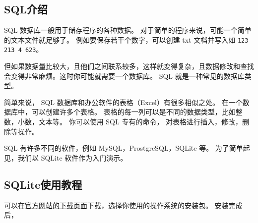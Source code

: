 

\subsection{SQL介绍}
SQL 数据库一般用于储存程序的各种数据。 对于简单的程序来说，可能一个简单的文本文件就足够了。 例如要保存若干个数字，可以创建 txt 文档并写入如 \verb|123 213 4 623|。

但如果数据量比较大，且他们之间联系较多，这样就变得复杂，且数据修改和查找会变得非常麻烦。这时你可能就需要一个数据库。 SQL 就是一种常见的数据库类型。

简单来说， SQL 数据库和办公软件的表格（Excel）有很多相似之处。 在一个数据库中，可以创建许多个表格。 表格的每一列可以是不同的数据类型，比如整数，小数，文本等。 你可以使用 SQL 专有的命令， 对表格进行插入，修改，删除等操作。

SQL 有许多不同的软件，例如 MySQL，ProstgreSQL，SQLite 等。 为了简单起见，我们以 SQLite 软件作为入门演示。
\subsection{SQLite使用教程}

可以在\href{https://sqlitebrowser.org/dl/}{官方网站的下载页面}下载，选择你使用的操作系统的安装包。 安装完成后，







